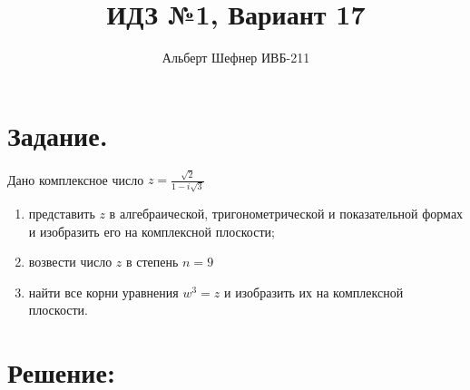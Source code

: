\documentclass[12pt, a4paper]{article}
\title{ИДЗ №1, Вариант 17}
\author{Альберт Шефнер ИВБ-211}
\begin{document}
\maketitle
\tableofcontents

%
%
\section{Задание.}

Дано комплексное число
\begin{math}
    z = \frac{\sqrt{2}}{1 - i\sqrt{3}}
\end{math}
\begin{enumerate}
    \item [а)] представить
        \begin{math}
            z
        \end{math}
        в алгебраической, тригонометрической и показательной
        формах и изобразить его на комплексной плоскости;
    \item [б)] возвести число $z$ в степень $n = 9$
    \item [в)] найти все корни уравнения
        \begin{math}
            w^3 = z
        \end{math}
        и изобразить их на комплексной плоскости.
\end{enumerate}

\section*{Решение:}
\end{document}
